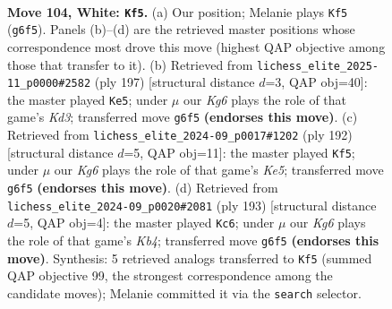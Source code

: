 \documentclass[11pt]{article}
\begin{document}
\clearpage

\begin{figure}[p]\centering
\begin{subfigure}{0.46\textwidth}\centering
\resizebox{\linewidth}{!}{%
\newchessgame
\chessboard[
  setfen={8/3k4/6K1/8/8/1N6/2R3Pr/8 w - - 72 104},
  showmover=false,
  pgfstyle=straightmove, color=movearrow, markmove={g6-f5}
]}
\caption{}
\end{subfigure}\hfill
\begin{subfigure}{0.46\textwidth}\centering
\resizebox{\linewidth}{!}{%
\newchessgame
\chessboard[
  setfen={8/8/3k4/1K6/7r/7p/7R/8 b - - 14 99},
  showmover=false,
  pgfstyle=straightmove, color=movearrow, markmove={d6-e5}
]}
\caption{}
\end{subfigure}
\\[4pt]
\begin{subfigure}{0.46\textwidth}\centering
\resizebox{\linewidth}{!}{%
\newchessgame
\chessboard[
  setfen={5k2/2R4P/8/4K3/7r/8/8/8 w - - 23 97},
  showmover=false,
  pgfstyle=straightmove, color=movearrow, markmove={e5-f5}
]}
\caption{}
\end{subfigure}\hfill
\begin{subfigure}{0.46\textwidth}\centering
\resizebox{\linewidth}{!}{%
\newchessgame
\chessboard[
  setfen={8/R7/8/1k6/8/8/p5r1/2K5 b - - 21 97},
  showmover=false,
  pgfstyle=straightmove, color=movearrow, markmove={b5-c6}
]}
\caption{}
\end{subfigure}
\caption{\textbf{Move 104, White: \texttt{Kf5}.} (a) Our position; Melanie plays \texttt{Kf5} (\texttt{g6f5}). Panels (b)--(d) are the retrieved master positions whose correspondence most drove this move (highest QAP objective among those that transfer to it). (b) Retrieved from \texttt{lichess\_elite\_2025-11\_p0000\#2582} (ply 197) [structural distance $d$=3, QAP obj=40]: the master played \texttt{Ke5}; under $\mu$ our \emph{Kg6} plays the role of that game's \emph{Kd3}; transferred move \texttt{g6f5} \textbf{(endorses this move)}. (c) Retrieved from \texttt{lichess\_elite\_2024-09\_p0017\#1202} (ply 192) [structural distance $d$=5, QAP obj=11]: the master played \texttt{Kf5}; under $\mu$ our \emph{Kg6} plays the role of that game's \emph{Ke5}; transferred move \texttt{g6f5} \textbf{(endorses this move)}. (d) Retrieved from \texttt{lichess\_elite\_2024-09\_p0020\#2081} (ply 193) [structural distance $d$=5, QAP obj=4]: the master played \texttt{Kc6}; under $\mu$ our \emph{Kg6} plays the role of that game's \emph{Kb4}; transferred move \texttt{g6f5} \textbf{(endorses this move)}. Synthesis: 5 retrieved analogs transferred to \texttt{Kf5} (summed QAP objective 99, the strongest correspondence among the candidate moves); Melanie committed it via the \texttt{search} selector.}
\label{fig:thought-m206}
\end{figure}
\end{document}
